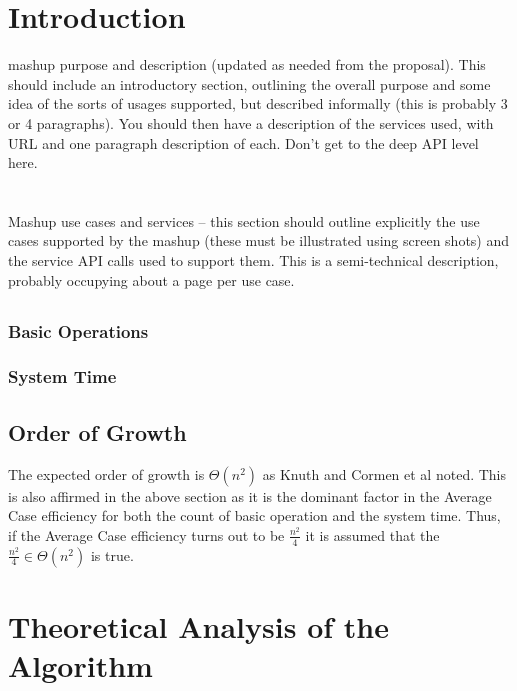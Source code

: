 \documentclass[12pt]{article}
\begin{document}
\section{Introduction}
 mashup purpose and description (updated as needed from the proposal). This should include an introductory section, outlining the overall purpose and some idea of the sorts of usages supported, but described informally (this is probably 3 or 4 paragraphs). You should then have a description of the services used, with URL and one paragraph description of each. Don’t get to the deep API level here.
 
 

\section{  }
Mashup use cases and services – this section should outline explicitly the use cases supported by the mashup (these must be illustrated using screen shots) and the service API calls used to support them. This is a semi-technical description, probably
occupying about a page per use case.
\subsection{}

\subsubsection{Basic Operations}


\subsubsection{System Time}


\subsection{Order of Growth}
 The expected order of growth is $\Theta(n^2)$ as Knuth\cite[p.80]{knuth1998art} and Cormen et al \cite[p.26]{cormen2009linear} noted. This is also affirmed in the above section as it is the dominant factor in the Average Case efficiency for both the count of basic operation and the system time. Thus, if the Average Case efficiency turns out to be $\frac{n^2}{4}$ it is assumed that the $\frac{n^2}{4}	\in\Theta(n^2)$ is true.


\section{Theoretical Analysis of the Algorithm}
\end{document}
